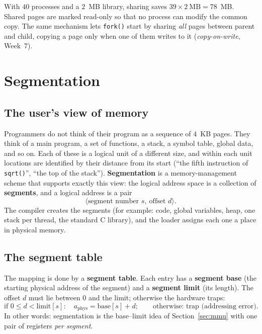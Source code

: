 \documentclass[11pt,a4paper]{article}
\newcommand{\term}[1]{\textbf{\color{mintdeep}#1}}
\newcommand{\cmd}[1]{\texttt{#1}}
\begin{document}
With $40$ processes and a $2$~MB library, sharing saves $39 \times 2\ \text{MB} = 78$~MB. Shared pages are marked read-only so that no process can modify the common copy. The same mechanism lets \cmd{fork()} start by sharing \emph{all} pages between parent and child, copying a page only when one of them writes to it (\emph{copy-on-write}, Week~7).

\section{Segmentation}

\subsection{The user's view of memory}

Programmers do not think of their program as a sequence of $4$~KB pages. They think of a main program, a set of functions, a stack, a symbol table, global data, and so on. Each of these is a logical unit of a different size, and within each unit locations are identified by their distance from its start (``the fifth instruction of \cmd{sqrt()}'', ``the top of the stack''). \term{Segmentation} is a memory-management scheme that supports exactly this view: the logical address space is a collection of \term{segments}, and a logical address is a pair
\[
\langle \text{segment number } s,\ \text{offset } d \rangle .
\]
The compiler creates the segments (for example: code, global variables, heap, one stack per thread, the standard C library), and the loader assigns each one a place in physical memory.

\subsection{The segment table}
\label{sec:segtable}

The mapping is done by a \term{segment table}. Each entry has a \term{segment base} (the starting physical address of the segment) and a \term{segment limit} (its length). The offset $d$ must lie between $0$ and the limit; otherwise the hardware traps:
\[
\text{if } 0 \le d < \text{limit}[s]:\quad a_{\text{phys}} = \text{base}[s] + d;\qquad\text{otherwise: trap (addressing error).}
\]
In other words: segmentation is the base--limit idea of Section~\ref{sec:mmu} with one pair of registers \emph{per segment}.
\end{document}
